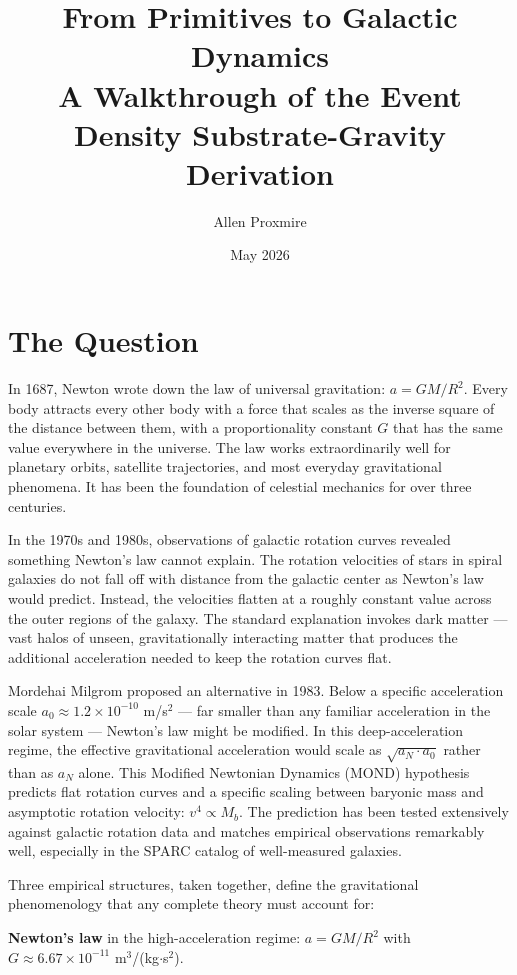 \documentclass[11pt,a4paper]{article}
\title{\vspace{-1cm}\Large\bfseries From Primitives to Galactic Dynamics\\[6pt]
\large\mdseries A Walkthrough of the Event Density Substrate-Gravity Derivation}
\author{Allen Proxmire}
\date{May 2026}
\begin{document}
\maketitle
\thispagestyle{empty}

\section{The Question}

In 1687, Newton wrote down the law of universal gravitation: $a = GM/R^2$. Every body attracts every other body with a force that scales as the inverse square of the distance between them, with a proportionality constant $G$ that has the same value everywhere in the universe. The law works extraordinarily well for planetary orbits, satellite trajectories, and most everyday gravitational phenomena. It has been the foundation of celestial mechanics for over three centuries.

In the 1970s and 1980s, observations of galactic rotation curves revealed something Newton's law cannot explain. The rotation velocities of stars in spiral galaxies do not fall off with distance from the galactic center as Newton's law would predict. Instead, the velocities flatten at a roughly constant value across the outer regions of the galaxy. The standard explanation invokes dark matter --- vast halos of unseen, gravitationally interacting matter that produces the additional acceleration needed to keep the rotation curves flat.

Mordehai Milgrom proposed an alternative in 1983. Below a specific acceleration scale $a_0 \approx 1.2 \times 10^{-10}$ m/s$^2$ --- far smaller than any familiar acceleration in the solar system --- Newton's law might be modified. In this deep-acceleration regime, the effective gravitational acceleration would scale as $\sqrt{a_N \cdot a_0}$ rather than as $a_N$ alone. This Modified Newtonian Dynamics (MOND) hypothesis predicts flat rotation curves and a specific scaling between baryonic mass and asymptotic rotation velocity: $v^4 \propto M_b$. The prediction has been tested extensively against galactic rotation data and matches empirical observations remarkably well, especially in the SPARC catalog of well-measured galaxies.

Three empirical structures, taken together, define the gravitational phenomenology that any complete theory must account for:

\textbf{Newton's law} in the high-acceleration regime: $a = GM/R^2$ with $G \approx 6.67 \times 10^{-11}$ m$^3$/(kg$\cdot$s$^2$).
\end{document}
